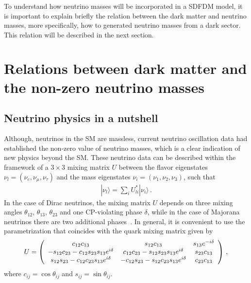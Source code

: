 To understand how neutrino masses will be incorporated in a SDFDM model, it is important to explain briefly the relation between the dark matter and neutrino masses, more specifically, how to generated neutrino masses from a dark sector. This relation will be described in the next section.











\section{Relations between dark matter and the non-zero neutrino masses}

\subsection*{Neutrino physics in a nutshell}
\label{sec:intro-neutrino}
%
Although, neutrinos in the SM are massless, current neutrino oscillation data had established the non-zero value of neutrino masses, which is a clear indication of new physics beyond the SM. 
These neutrino data can be described within the framework of a $3\times 3$ mixing matrix $U$ between the flavor eigenstates $\nu_l=(\nu_e,\nu_{\mu},\nu_{\tau})$ and the mass eigenstates $\nu_i=(\nu_1,\nu_2,\nu_3)$, such that
%
\begin{align}
|\nu_l\rangle = \sum_i U_{li}^*|\nu_i\rangle \,.
\end{align}
%
In the case of Dirac neutrinos, the mixing matrix  $U$ depends on three mixing angles $\theta_{12}$, $\theta_{13}$, $\theta_{23}$ and one CP-violating phase $\delta$, while in the case of Majorana neutrinos there are two additional phases~\cite{Akhmedov:1999uz}. 
In general, it is convenient to use the parametrization that coincides with the quark mixing matrix given by
%
\begin{displaymath}
U=\left(\begin{array}{c c c}
c_{12}c_{13} & s_{12}c_{13}& s_{13}e^{-i\delta}\\
-s_{12}c_{23}-c_{12}s_{23}s_{13}e^{i\delta} & c_{12}c_{23}-s_{12}s_{23}s_{13}e^{i\delta} & s_{23}c_{13}\\
s_{12}s_{23}-c_{12}c_{23}s_{13}e^{i\delta} & -c_{12}s_{23}-s_{12}c_{23}s_{13}e^{i\delta} & c_{23}c_{13}
\end{array} \right)\,,
\end{displaymath}
%
where $c_{ij}=\cos \theta_{ij}$ and $s_{ij}=\sin \theta_{ij}$.

